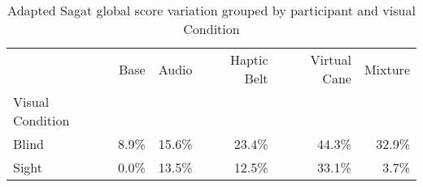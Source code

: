 
\begin{table}[!htb]
\centering
\caption{Adapted Sagat global score variation grouped by participant and visual Condition}
\label{tab:sagat_var_average_group}
\begin{tabular}{lrrrrr}
\toprule
{} &  Base &  Audio &  Haptic Belt &  Virtual Cane &  Mixture \\
Visual Condition &       &        &              &               &          \\
\midrule
Blind            & 8.9\% & 15.6\% &       23.4\% &        44.3\% &   32.9\% \\
Sight            & 0.0\% & 13.5\% &       12.5\% &        33.1\% &    3.7\% \\
\bottomrule
\end{tabular}
\end{table}

